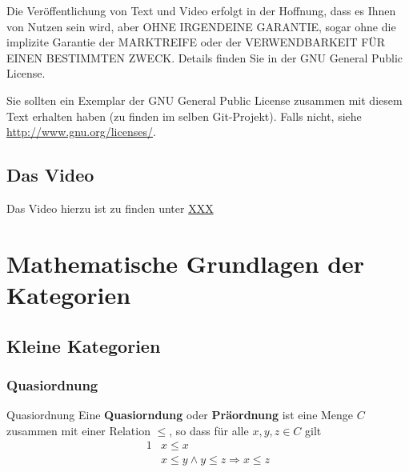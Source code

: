 \documentclass[a4paper]{amsart}
\theoremstyle{definition}
\begin{document}
Die Veröffentlichung von Text und Video erfolgt in der Hoffnung, dass es Ihnen von Nutzen sein wird,
aber OHNE IRGENDEINE GARANTIE, sogar ohne die implizite Garantie der MARKTREIFE oder der
VERWENDBARKEIT FÜR EINEN BESTIMMTEN ZWECK. Details finden Sie in der GNU General Public License.

Sie sollten ein Exemplar der GNU General Public License zusammen mit diesem Text erhalten haben
(zu finden im selben Git-Projekt).
Falls nicht, siehe \url{http://www.gnu.org/licenses/}.

\subsection*{Das Video}
Das Video hierzu ist zu finden unter
{\tiny
   \url{XXX}
}

\section{Mathematische Grundlagen der Kategorien}

\subsection{Kleine Kategorien}

\subsubsection{Quasiordnung}
\begin{Definition}{Quasiordnung}
   Eine \textbf{Quasiorndung} oder \textbf{Präordnung} ist eine Menge $C$ zusammen mit einer Relation $\le$, so dass für alle $x, y, z \in C$ gilt
   \begin{alignat}{1}
      &x \le x\\
      &x \le y \land y \le z \Rightarrow x \le z
   \end{alignat}
\end{Definition}
\end{document}
